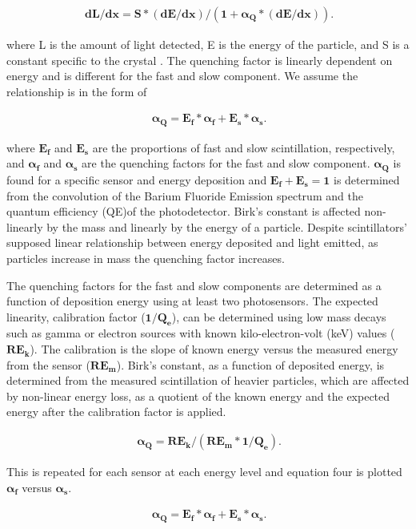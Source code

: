 \documentclass[aip, jmp, amsmath, amssymb, reprint, floatfix]{revtex4-1}
\begin{document}
\begin{eqnarray}
\ \bm{dL/dx = S * (dE/dx)/(1 + \alpha_Q * (dE/dx))}
\label{eq:one}.
\end{eqnarray}


where L is the amount of light detected, E is the energy of the particle, and S is a constant specific to the crystal \cite{BaF2scint}. The quenching factor is linearly dependent on energy and is different for the fast and slow component. We assume the relationship is in the form of 

\begin{eqnarray}
\ \bm{\alpha_Q = E_f * \alpha_f + E_s * \alpha_s}
\label{eq:two}.
\end{eqnarray}

where $\bm{E_f}$ and $\bm{E_s}$ are the proportions of fast and slow scintillation, respectively, and $\bm{\alpha_f}$ and $\bm{\alpha_s}$ are the quenching factors for the fast and slow component. $\bm{\alpha_Q}$ is found for a specific sensor and energy deposition and $\bm{E_f + E_s = 1}$ is determined from the convolution of the Barium Fluoride Emission spectrum and the quantum efficiency (QE)of the photodetector. Birk's constant is affected non-linearly by the mass and linearly by the energy of a particle. Despite scintillators' supposed linear relationship between energy deposited and light emitted, as particles increase in mass the quenching factor increases. 

The quenching factors for the fast and slow components are determined as a function of deposition energy using at least two photosensors. The expected linearity, calibration factor ($\bm{1/Q_e}$), can be determined using low mass decays such as gamma or electron sources with known kilo-electron-volt (keV) values ($\bm{RE_k}$). The calibration is the slope of known energy versus the measured energy from the sensor ($\bm{RE_m}$). Birk's constant, as a function of deposited energy, is determined from the measured scintillation of heavier particles, which are affected by non-linear energy loss, as a quotient of the known energy and the expected energy after the calibration factor is applied. 

\begin{eqnarray}
\ \bm{\alpha_Q = RE_k / (RE_m * 1/Q_e)}
\label{eq:three}.
\end{eqnarray}

This is repeated for each sensor at each energy level and equation four is plotted $\bm{\alpha_f}$ versus $\bm{\alpha_s}$.  

\begin{eqnarray}
\ \bm{\alpha_Q = E_f * \alpha_f + E_s * \alpha_s}
\label{eq:four}.
\end{eqnarray}
\end{document}
